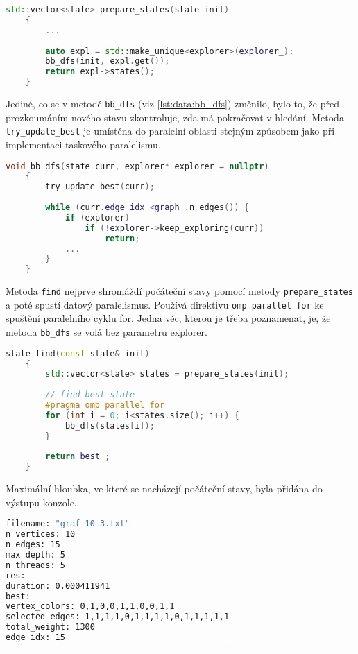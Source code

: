 \begin{lstlisting}[language=C++, label={lst:data:prepare_states}, title={Metoda pro přípravu počátečních stavů}]
    std::vector<state> prepare_states(state init)
    {
        ...
    
        auto expl = std::make_unique<explorer>(explorer_);
        bb_dfs(init, expl.get());
        return expl->states();
    }
\end{lstlisting}

Jediné, co se v metodě \texttt{bb\_dfs} (viz \ref{lst:data:bb_dfs}) změnilo, bylo to, že před prozkoumáním nového stavu zkontroluje, zda má pokračovat v hledání.
Metoda \texttt{try\_update\_best} je umístěna do paralelní oblasti stejným způsobem jako při implementaci taskového paralelismu.

\begin{lstlisting}[language=C++, label={lst:data:bb_dfs}, title={Metoda pro prohledávání stavového prostoru}]
    void bb_dfs(state curr, explorer* explorer = nullptr)
    {
        try_update_best(curr);
        
        while (curr.edge_idx_<graph_.n_edges()) {
            if (explorer)
                if (!explorer->keep_exploring(curr))
                    return;
            ...
        }
    }
\end{lstlisting}

Metoda \texttt{find} nejprve shromáždí počáteční stavy pomocí metody \texttt{prepare\_states} a poté spustí datový paralelismus.
Používá direktivu \texttt{omp parallel for} ke spuštění paralelního cyklu for.
Jedna věc, kterou je třeba poznamenat, je, že metoda \texttt{bb\_dfs} se volá bez parametru explorer.

\begin{lstlisting}[language=C++, label={lst:data:find}, title={Metoda pro nalezení nejlepšího stavu}]
    state find(const state& init)
    {
        std::vector<state> states = prepare_states(init);
    
        // find best state
        #pragma omp parallel for
        for (int i = 0; i<states.size(); i++) {
            bb_dfs(states[i]);
        }
    
        return best_;
    }
\end{lstlisting}

Maximální hloubka, ve které se nacházejí počáteční stavy, byla přidána do výstupu konzole.

\begin{lstlisting}[language=bash, label={lst:data:console_log}, title={Příklad výpisu výsledků}]
filename: "graf_10_3.txt"
n vertices: 10
n edges: 15
max depth: 5
n threads: 5
res:
duration: 0.000411941
best:
vertex_colors: 0,1,0,0,1,1,0,0,1,1
selected_edges: 1,1,1,1,0,1,1,1,1,0,1,1,1,1,1
total_weight: 1300
edge_idx: 15
--------------------------------------------------
\end{lstlisting}









